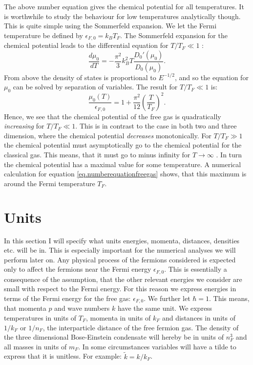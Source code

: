 The above number equation gives the chemical potential for all temperatures. It is worthwhile to study the behaviour for low temperatures analytically though. This is quite simple using the Sommerfeld expansion. We let the Fermi temperature be defined by $\epsilon_{F,0} = k_B T_F$. The Sommerfeld expansion for the chemical potential leads to the differential equation for $T/T_F \ll 1$ \cite[pp. 115-116]{GiuseppeGiuseppe}:
\begin{equation}
\frac{d\mu_0}{dT} = -\frac{\pi^2}{3}k_B^2 T \frac{D_0'(\mu_0)}{D_0(\mu_0)}. \nonumber
\end{equation}
From above the density of states is proportional to $E^{-1/2}$, and so the equation for $\mu_0$ can be solved by separation of variables. The result for $T/T_F\ll 1$ is:
\begin{equation}
\frac{\mu_0(T)}{\epsilon_{F,0}} = 1 + \frac{\pi^2}{12}\left(\frac{T}{T_F}\right)^2. 
\label{eq.Sommerfeldexpansionchemicalpotential}
\end{equation}
Hence, we see that the chemical potential of the free gas is quadratically \textit{increasing} for $T/T_F \ll 1$. This is in contrast to the case in both two and three dimension, where the chemical potential \textit{decreases} monotonically. For $T/T_F \gg 1$ the chemical potential must asymptotically go to the chemical potential for the classical gas. This means, that it must go to minus infinity for $T\to \infty$ \cite[pp. 117-118]{SchroederThermal}. In turn the chemical potential has a maximal value for some temperature. A numerical calculation for equation \eqref{eq.numberequationfreegas} shows, that this maximum is around the Fermi temperature $T_F$. 

\section{Units}
In this section I will specify what units energies, momenta, distances, densities etc. will be in. This is especially important for the numerical analyses we will perform later on. Any physical process of the fermions considered is expected only to affect the fermions near the Fermi energy $\epsilon_{F,0}$. This is essentially a consequence of the assumption, that the other relevant energies we consider are small with respect to the Fermi energy. For this reason we express energies in terms of the Fermi energy for the free gas: $\epsilon_{F,0}$. We further let $\hbar = 1$. This means, that momenta $p$ and wave numbers $k$ have the same unit. We express temperatures in units of $T_F$, momenta in units of $k_F$ and distances in units of $1/k_F$ or $1/n_F$, the interparticle distance of the free fermion gas. The density of the three dimensional Bose-Einstein condensate will hereby be in units of $n_F^3$ and all masses in units of $m_F$. In some circumstances variables will have a tilde to express that it is unitless. For example: $\tilde{k} = k/k_F$.

